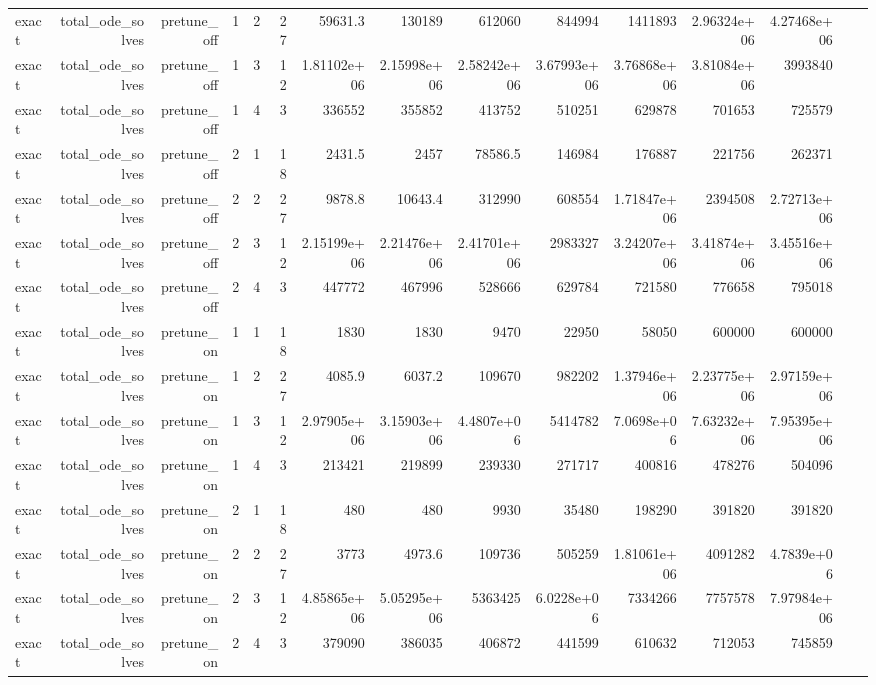 \begin{table}[htbp]
\begin{tabular}{lrrrrrrrrrrrrrr}
exact & total\_ode\_solves & pretune\_off & 1 & 2 & 27 & 59631.3 & 130189 & 612060 & 844994 & 1411893 & 2.96324e+06 & 4.27468e+06 &  &  \\
exact & total\_ode\_solves & pretune\_off & 1 & 3 & 12 & 1.81102e+06 & 2.15998e+06 & 2.58242e+06 & 3.67993e+06 & 3.76868e+06 & 3.81084e+06 & 3993840 &  &  \\
exact & total\_ode\_solves & pretune\_off & 1 & 4 & 3 & 336552 & 355852 & 413752 & 510251 & 629878 & 701653 & 725579 &  &  \\
exact & total\_ode\_solves & pretune\_off & 2 & 1 & 18 & 2431.5 & 2457 & 78586.5 & 146984 & 176887 & 221756 & 262371 &  &  \\
exact & total\_ode\_solves & pretune\_off & 2 & 2 & 27 & 9878.8 & 10643.4 & 312990 & 608554 & 1.71847e+06 & 2394508 & 2.72713e+06 &  &  \\
exact & total\_ode\_solves & pretune\_off & 2 & 3 & 12 & 2.15199e+06 & 2.21476e+06 & 2.41701e+06 & 2983327 & 3.24207e+06 & 3.41874e+06 & 3.45516e+06 &  &  \\
exact & total\_ode\_solves & pretune\_off & 2 & 4 & 3 & 447772 & 467996 & 528666 & 629784 & 721580 & 776658 & 795018 &  &  \\
exact & total\_ode\_solves & pretune\_on & 1 & 1 & 18 & 1830 & 1830 & 9470 & 22950 & 58050 & 600000 & 600000 &  &  \\
exact & total\_ode\_solves & pretune\_on & 1 & 2 & 27 & 4085.9 & 6037.2 & 109670 & 982202 & 1.37946e+06 & 2.23775e+06 & 2.97159e+06 &  &  \\
exact & total\_ode\_solves & pretune\_on & 1 & 3 & 12 & 2.97905e+06 & 3.15903e+06 & 4.4807e+06 & 5414782 & 7.0698e+06 & 7.63232e+06 & 7.95395e+06 &  &  \\
exact & total\_ode\_solves & pretune\_on & 1 & 4 & 3 & 213421 & 219899 & 239330 & 271717 & 400816 & 478276 & 504096 &  &  \\
exact & total\_ode\_solves & pretune\_on & 2 & 1 & 18 & 480 & 480 & 9930 & 35480 & 198290 & 391820 & 391820 &  &  \\
exact & total\_ode\_solves & pretune\_on & 2 & 2 & 27 & 3773 & 4973.6 & 109736 & 505259 & 1.81061e+06 & 4091282 & 4.7839e+06 &  &  \\
exact & total\_ode\_solves & pretune\_on & 2 & 3 & 12 & 4.85865e+06 & 5.05295e+06 & 5363425 & 6.0228e+06 & 7334266 & 7757578 & 7.97984e+06 &  &  \\
exact & total\_ode\_solves & pretune\_on & 2 & 4 & 3 & 379090 & 386035 & 406872 & 441599 & 610632 & 712053 & 745859 &  &  \\

\end{tabular}
\end{table}
